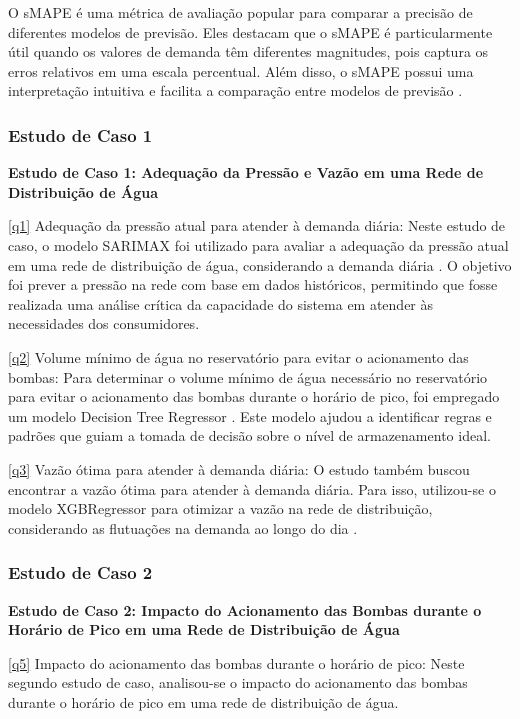 O sMAPE é uma métrica de avaliação popular para comparar a precisão de diferentes modelos de previsão. Eles destacam que o sMAPE é particularmente útil quando os valores de demanda têm diferentes magnitudes, pois captura os erros relativos em uma escala percentual. Além disso, o sMAPE possui uma interpretação intuitiva e facilita a comparação entre modelos de previsão \cite{hyndman2006effect}.

\subsubsection{Estudo de Caso 1}

\noindent\textbf{Estudo de Caso 1: Adequação da Pressão e Vazão em uma Rede de Distribuição de Água}

\eqref{q1} Adequação da pressão atual para atender à demanda diária: Neste estudo de caso, o modelo SARIMAX  foi utilizado para avaliar a adequação da pressão atual em uma rede de distribuição de água, considerando a demanda diária \cite{2-s2.0-85099424908}. O objetivo foi prever a pressão na rede com base em dados históricos, permitindo que fosse realizada uma análise crítica da capacidade do sistema em atender às necessidades dos consumidores.

\eqref{q2} Volume mínimo de água no reservatório para evitar o acionamento das bombas: Para determinar o volume mínimo de água necessário no reservatório para evitar o acionamento das bombas durante o horário de pico, foi empregado um modelo Decision Tree Regressor  \cite{2-s2.0-85054695177}. Este modelo ajudou a identificar regras e padrões que guiam a tomada de decisão sobre o nível de armazenamento ideal.

\eqref{q3} Vazão ótima para atender à demanda diária: O estudo também buscou encontrar a vazão ótima para atender à demanda diária. Para isso, utilizou-se o modelo XGBRegressor  para otimizar a vazão na rede de distribuição, considerando as flutuações na demanda ao longo do dia \cite{2-s2.0-85130441623}.

\subsubsection{Estudo de Caso 2}

\noindent\textbf{Estudo de Caso 2: Impacto do Acionamento das Bombas durante o Horário de Pico em uma Rede de Distribuição de Água}

\eqref{q5} Impacto do acionamento das bombas durante o horário de pico: Neste segundo estudo de caso, analisou-se o impacto do acionamento das bombas durante o horário de pico em uma rede de distribuição de água.

